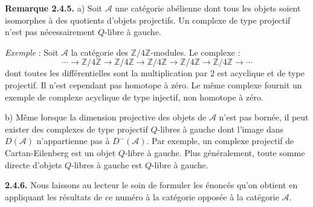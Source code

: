 \clearpage
{}%
\begingroup\small\setlength{\parskip}{0pt}\setlength{\emergencystretch}{1.5em}
\setlength{\abovedisplayskip}{4pt plus 2pt minus 2pt}%
\setlength{\belowdisplayskip}{4pt plus 2pt minus 2pt}%

\noindent\textbf{Remarque 2.4.5.}\quad
a) Soit $\mathcal A$ une catégorie abélienne dont tous les objets soient
isomorphes à des quotients d'objets projectifs. Un complexe de type
projectif n'est pas nécessairement $Q$-libre à gauche.

\emph{Exemple} : Soit $\mathcal A$ la catégorie des
$\mathbb Z/4\mathbb Z$-modules. Le complexe :
\[
\cdots\longrightarrow\mathbb Z/4\mathbb Z
\longrightarrow\mathbb Z/4\mathbb Z
\longrightarrow\mathbb Z/4\mathbb Z
\longrightarrow\mathbb Z/4\mathbb Z
\longrightarrow\mathbb Z/4\mathbb Z\longrightarrow\cdots
\]
dont toutes les différentielles sont la multiplication par $2$ est
acyclique et de type projectif. Il n'est cependant pas homotope à zéro. Le
même complexe fournit un exemple de complexe acyclique de type injectif,
non homotope à zéro.

b) Même lorsque la dimension projective des objets de $\mathcal A$ n'est
pas bornée, il peut exister des complexes de type projectif $Q$-libres à
gauche dont l'image dans $D(\mathcal A)$ n'appartienne pas à
$D^{-}(\mathcal A)$. Par exemple, un complexe projectif de
Cartan-Eilenberg est un objet $Q$-libre à gauche. Plus généralement, toute
somme directe d'objets $Q$-libres à gauche est $Q$-libre à gauche.

\medskip\noindent\textbf{2.4.6.}\quad
Nous laissons au lecteur le soin de formuler les énoncés qu'on obtient en
appliquant les résultats de ce numéro à la catégorie opposée à la catégorie
$\mathcal A$.
\endgroup

